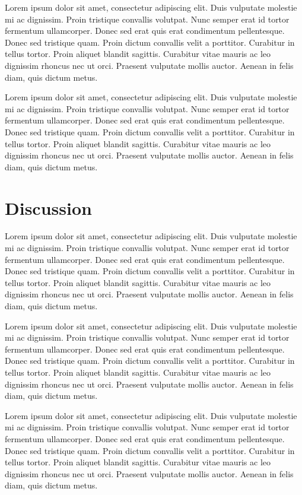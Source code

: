 \documentclass[11pt]{article}
\begin{document}
Lorem ipsum dolor sit amet, consectetur adipiscing elit. Duis vulputate molestie mi ac dignissim. Proin tristique convallis volutpat. Nunc semper erat id tortor fermentum ullamcorper. Donec sed erat quis erat condimentum pellentesque. Donec sed tristique quam. Proin dictum convallis velit a porttitor. Curabitur in tellus tortor. Proin aliquet blandit sagittis. Curabitur vitae mauris ac leo dignissim rhoncus nec ut orci. Praesent vulputate mollis auctor. Aenean in felis diam, quis dictum metus.

Lorem ipsum dolor sit amet, consectetur adipiscing elit. Duis vulputate molestie mi ac dignissim. Proin tristique convallis volutpat. Nunc semper erat id tortor fermentum ullamcorper. Donec sed erat quis erat condimentum pellentesque. Donec sed tristique quam. Proin dictum convallis velit a porttitor. Curabitur in tellus tortor. Proin aliquet blandit sagittis. Curabitur vitae mauris ac leo dignissim rhoncus nec ut orci. Praesent vulputate mollis auctor. Aenean in felis diam, quis dictum metus.

\section{Discussion}
Lorem ipsum dolor sit amet, consectetur adipiscing elit. Duis vulputate molestie mi ac dignissim. Proin tristique convallis volutpat. Nunc semper erat id tortor fermentum ullamcorper. Donec sed erat quis erat condimentum pellentesque. Donec sed tristique quam. Proin dictum convallis velit a porttitor. Curabitur in tellus tortor. Proin aliquet blandit sagittis. Curabitur vitae mauris ac leo dignissim rhoncus nec ut orci. Praesent vulputate mollis auctor. Aenean in felis diam, quis dictum metus.

Lorem ipsum dolor sit amet, consectetur adipiscing elit. Duis vulputate molestie mi ac dignissim. Proin tristique convallis volutpat. Nunc semper erat id tortor fermentum ullamcorper. Donec sed erat quis erat condimentum pellentesque. Donec sed tristique quam. Proin dictum convallis velit a porttitor. Curabitur in tellus tortor. Proin aliquet blandit sagittis. Curabitur vitae mauris ac leo dignissim rhoncus nec ut orci. Praesent vulputate mollis auctor. Aenean in felis diam, quis dictum metus.

Lorem ipsum dolor sit amet, consectetur adipiscing elit. Duis vulputate molestie mi ac dignissim. Proin tristique convallis volutpat. Nunc semper erat id tortor fermentum ullamcorper. Donec sed erat quis erat condimentum pellentesque. Donec sed tristique quam. Proin dictum convallis velit a porttitor. Curabitur in tellus tortor. Proin aliquet blandit sagittis. Curabitur vitae mauris ac leo dignissim rhoncus nec ut orci. Praesent vulputate mollis auctor. Aenean in felis diam, quis dictum metus.
\end{document}
